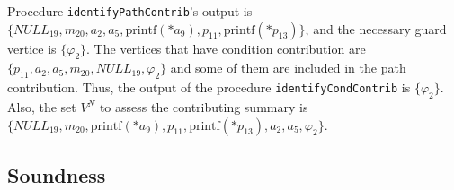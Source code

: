 \begin{example}
Procedure \texttt{identifyPathContrib}'s output is $\{ NULL_{19}, m_{20}, a_2, a_5, \text{printf}(*a_9), p_{11}, \text{printf}(*p_{13}) \}$, and the necessary guard vertice is $\{ \varphi_2 \}$.
The vertices that have condition contribution are $\{ p_{11}, a_2, a_5, m_{20}, NULL_{19}, \varphi_2 \}$ and some of them are included in the path contribution. 
Thus, the output of the procedure \texttt{identifyCondContrib} is $\{ \varphi_2 \}$.
Also, the set $V^{N}$ to assess the contributing summary is $\{ NULL_{19}, m_{20}, \text{printf}(*a_9), p_{11}, \text{printf}(*p_{13}), a_2, a_5, \varphi_2 \}$.
\end{example}

\subsection{Soundness}
\label{sec:sound}



